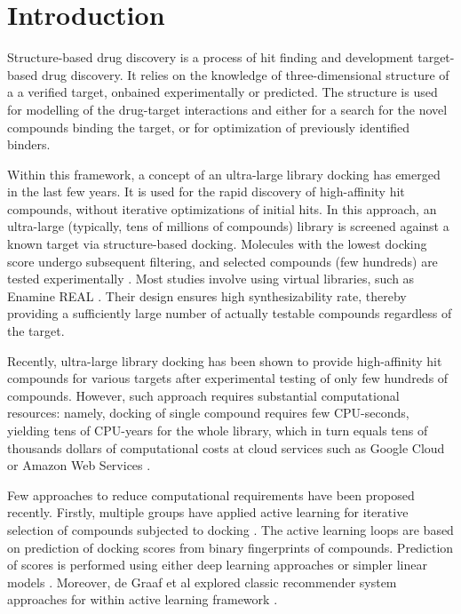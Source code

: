 \section{Introduction}

Structure-based drug discovery is a process of hit finding and development target-based drug discovery. It relies on the knowledge of three-dimensional structure of a a verified target, onbained experimentally or predicted. The structure is used for modelling of the drug-target interactions and either for a search for the novel compounds binding the target, or for optimization of previously identified binders.

Within this framework, a concept of an ultra-large library docking has emerged in the last few years. It is used for the rapid discovery of high-affinity hit compounds, without iterative optimizations of initial hits. In this approach, an ultra-large (typically, tens of millions of compounds) library is screened against a known target via structure-based docking. Molecules with the lowest docking score undergo subsequent filtering, and selected compounds (few hundreds) are tested experimentally \cite{bender_practical_2021}. Most studies involve using virtual libraries, such as Enamine REAL \cite{noauthor_real_nodate}. Their design ensures high synthesizability rate, thereby providing a sufficiently large number of actually testable compounds regardless of the target.

Recently, ultra-large library docking has been shown to provide high-affinity hit compounds for various targets \cite{sigma2_paper, melatonin_paper, ultralarge_docking_first, gorgulla_open-source_2020, beroza_chemical_2022, noauthor_large_nodate, lu_structure-guided_2021, sadybekov_synthon-based_2022, sadybekov_structure-based_2020} after experimental testing of only few hundreds of compounds. However, such approach requires substantial computational resources: namely, docking of single compound requires few CPU-seconds, yielding tens of CPU-years for the whole library, which in turn equals tens of thousands dollars of computational costs at cloud services such as Google Cloud or Amazon Web Services \cite{irwin_large_2023,grebner_virtual_2020}.

Few approaches to reduce computational requirements have been proposed recently. Firstly, multiple groups have applied active learning for iterative selection of compounds subjected to docking \cite{Graff2021AcceleratingLearning,autoencoders_guided_learning,logistic_regression,deepdocking,leandocking,Yang2021_shoichet_active_learning}. The active learning loops are based on prediction of docking scores from binary fingerprints of compounds. Prediction of scores is performed using either deep learning approaches \cite{deepdocking,Yang2021_shoichet_active_learning,autoencoders_guided_learning, Graff2021AcceleratingLearning} or simpler linear models \cite{leandocking,logistic_regression}. Moreover, de Graaf et al explored classic recommender system approaches for within active learning framework \cite{Graff2021AcceleratingLearning}. 

